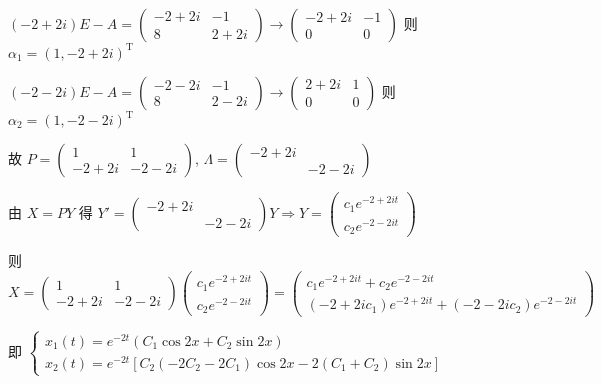 \begin{enumerate}
			       \( (-2+2i)E - A = \begin{pmatrix}
				       -2+2i & -1   \\
				       8     & 2+2i
			       \end{pmatrix} \rightarrow \begin{pmatrix}
				       -2+2i & -1 \\
				       0     & 0
			       \end{pmatrix} \) 则 \( \alpha_{1} = (1, -2+2i)^{\mathrm{T}} \)

			       \( (-2-2i)E - A = \begin{pmatrix}
				       -2-2i & -1   \\
				       8     & 2-2i
			       \end{pmatrix} \rightarrow \begin{pmatrix}
				       2+2i & 1 \\
				       0    & 0
			       \end{pmatrix} \) 则 \( \alpha_{2} = (1, -2-2i)^{\mathrm{T}} \)

			       故 \( P = \begin{pmatrix}
				       1     & 1     \\
				       -2+2i & -2-2i
			       \end{pmatrix} \), \( \Lambda = \begin{pmatrix}
				       -2+2i &       \\
				             & -2-2i
			       \end{pmatrix} \)

			       由 \( X = P Y \) 得 \( Y' = \begin{pmatrix}
				       -2+2i &       \\
				             & -2-2i
			       \end{pmatrix} Y \Rightarrow Y = \begin{pmatrix}
				       c_{1}e^{-2+2it} \\
				       c_{2}e^{-2-2it}
			       \end{pmatrix} \)

			       则 \( X = \begin{pmatrix}
				       1     & 1     \\
				       -2+2i & -2-2i
			       \end{pmatrix}\begin{pmatrix}
				       c_{1}e^{-2+2it} \\
				       c_{2}e^{-2-2it}
			       \end{pmatrix} = \begin{pmatrix}
				       c_{1}e^{-2+2it} + c_{2}e^{-2-2it} \\
				       (-2+2ic_{1})e^{-2+2it} + (-2-2ic_{2})e^{-2-2it}
			       \end{pmatrix} \)

			       即 \( \begin{cases} x_{1}(t) = e^{-2t}\left( C_{1}\cos 2x + C_{2}\sin 2x \right) \\
				       x_{2}(t) = e^{-2t}\left[ C_{2}(-2C_{2}-2C_{1})\cos 2x - 2(C_{1}+C_{2})\sin 2x \right]\end{cases} \)
		 \end{enumerate}


